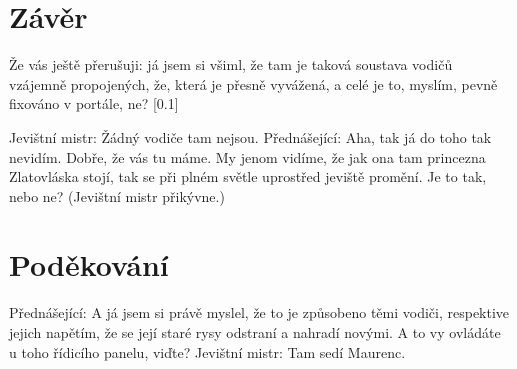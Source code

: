 \documentclass{cygclanek}
\begin{document}
\section{Závěr}
Že vás ještě přerušuji: já jsem si všiml, že tam je taková soustava vodičů vzájemně propojených, že, která je přesně vyvážená, a celé je to, myslím, pevně fixováno v portále, ne?
[0.1]

Jevištní mistr: Žádný vodiče tam nejsou. Přednášející: Aha, tak já do toho tak nevidím. Dobře, že vás tu máme. My jenom vidíme, že jak ona tam princezna Zlatovláska stojí, tak se při plném světle uprostřed jeviště promění. Je to tak, nebo ne? (Jevištní mistr přikývne.)
\section*{Poděkování}
Přednášející: A já jsem si právě myslel, že to je způsobeno těmi vodiči, respektive jejich napětím, že se její staré rysy odstraní a nahradí novými. A to vy ovládáte u toho řídicího panelu, viďte? Jevištní mistr: Tam sedí Maurenc.



\printbibliography[title={Literatura}]
\end{document}

